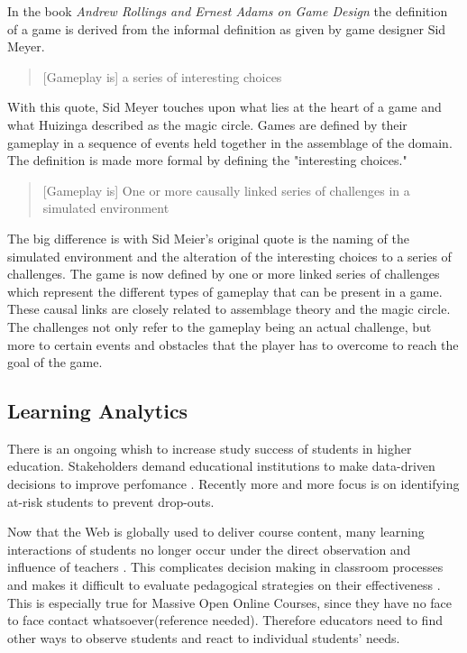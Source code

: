 \documentclass[11pt]{article}
\begin{document}
In the book \emph{Andrew Rollings and Ernest Adams on Game Design} \cite{Rollings2003} the definition of a game is derived from the informal definition as given by game designer Sid Meyer.
\begin{quotation}
	[Gameplay is] a series of interesting choices
\end{quotation}

With this quote, Sid Meyer touches upon what lies at the heart of a game and what Huizinga described as the magic circle. Games are defined by their gameplay in a sequence of events held together in the assemblage of the domain. The definition is made more formal by defining the "interesting choices." 

\begin{quotation}
	[Gameplay is] One or more causally linked series of challenges in a simulated environment \cite{Rollings2003}
\end{quotation}

The big difference is with Sid Meier's original quote is the naming of the simulated environment and the alteration of the interesting choices to a series of challenges. The game is now defined by one or more linked series of challenges which represent the different types of gameplay that can be present in a game. These causal links are closely related to assemblage theory and the magic circle. The challenges not only refer to the gameplay being an actual challenge, but more to certain events and obstacles that the player has to overcome to reach the goal of the game.


\subsection{Learning Analytics}\label{sec:learninganalytics}
There is an ongoing whish to increase study success of students in higher education. Stakeholders demand educational institutions to make data-driven decisions to improve perfomance \cite{Ferguson2012a}. Recently more and more focus is on identifying at-risk students to prevent drop-outs.

Now that the Web is globally used to deliver course content, many learning interactions of students no longer occur under the direct observation and influence of teachers \cite{Sheard2003}. This complicates decision making in classroom processes and makes it difficult to evaluate pedagogical strategies on their effectiveness \cite{Romero2007}. This is especially true for Massive Open Online Courses, since they have no face to face contact whatsoever(reference needed). Therefore educators need to find other ways to observe students and react to individual students' needs.
\end{document}
